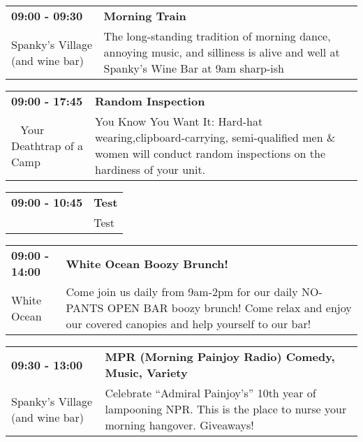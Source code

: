 \begin{tabular}{ p{1in} p{2.2in} }
    \textbf{09:00 - 09:30} & \textbf{Morning Train} \\
    Spanky's Village (and wine bar) \newline  & The long-standing tradition of morning dance, annoying music, and silliness is alive and well at Spanky's Wine Bar at 9am sharp-ish \\
    \hline 
\end{tabular}
    
\begin{tabular}{ p{1in} p{2.2in} }
    \textbf{09:00 - 17:45} & \textbf{Random Inspection} \\
    ~ \newline Your Deathtrap of a Camp & You Know You Want It:
Hard-hat wearing,clipboard-carrying, semi-qualified men \& women will conduct random inspections on the hardiness of your unit. \\
    \hline 
\end{tabular}
    
\begin{tabular}{ p{1in} p{2.2in} }
    \textbf{09:00 - 10:45} & \textbf{Test} \\
    ~ \newline  & Test \\
    \hline 
\end{tabular}
    
\begin{tabular}{ p{1in} p{2.2in} }
    \textbf{09:00 - 14:00} & \textbf{White Ocean Boozy Brunch!} \\
    White Ocean \newline  & Come join us daily from 9am-2pm for our daily NO-PANTS OPEN BAR boozy brunch! Come relax and enjoy our covered canopies and help yourself to our bar! \\
    \hline 
\end{tabular}
    
\begin{tabular}{ p{1in} p{2.2in} }
    \textbf{09:30 - 13:00} & \textbf{MPR (Morning Painjoy Radio) Comedy, Music, Variety} \\
    Spanky's Village (and wine bar) \newline  & Celebrate ``Admiral Painjoy's'' 10th year of lampooning NPR.  This is the place to nurse your morning hangover.  Giveaways! \\
    \hline 
\end{tabular}
    
